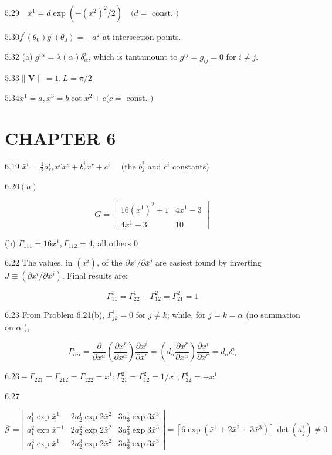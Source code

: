 \documentclass[10pt]{article}
\begin{document}
$5.29 \quad x^{1}=d \exp \left(-\left(x^{2}\right)^{2} / 2\right) \quad(d=$ const. $)$

$5.30 f^{\prime}\left(\theta_{0}\right) g^{\prime}\left(\theta_{0}\right)=-a^{2}$ at intersection points.

5.32 (a) $g^{i \alpha}=\lambda(\alpha) \delta_{\alpha}^{i}$, which is tantamount to $g^{i j}=g_{i j}=0$ for $i \neq j$.

$5.33\|\mathbf{V}\|=1, L=\pi / 2$

$5.34 x^{1}=a, x^{3}=b \cot x^{2}+c(c=$ const. $)$

\section*{CHAPTER 6}
6.19 $\bar{x}^{i}=\frac{1}{2} a_{r s}^{i} x^{r} x^{s}+b_{r}^{i} x^{r}+c^{i} \quad$ (the $b_{j}^{i}$ and $c^{i}$ constants)

$6.20(a)$

$$
G=\left[\begin{array}{cc}
16\left(x^{1}\right)^{2}+1 & 4 x^{1}-3 \\
4 x^{1}-3 & 10
\end{array}\right]
$$

(b) $\Gamma_{111}=16 x^{1}, \Gamma_{112}=4$, all others 0

6.22 The values, in $\left(x^{i}\right)$, of the $\partial x^{i} / \partial \bar{x}^{j}$ are easiest found by inverting $J \equiv\left(\partial \bar{x}^{i} / \partial x^{j}\right)$. Final results are:

$$
\Gamma_{11}^{1}=\Gamma_{22}^{1}-\Gamma_{12}^{2}=\Gamma_{21}^{2}=1
$$

6.23 From Problem 6.21(b), $\Gamma_{j k}^{i}=0$ for $j \neq k$; while, for $j=k=\alpha$ (no summation on $\alpha$ ),

$$
\Gamma_{\alpha \alpha}^{i}=\frac{\partial}{\partial x^{\alpha}}\left(\frac{\partial \bar{x}^{r}}{\partial x^{\alpha}}\right) \frac{\partial x^{i}}{\partial \bar{x}^{r}}=\left(d_{\alpha} \frac{\partial \bar{x}^{r}}{\partial x^{\alpha}}\right) \frac{\partial x^{i}}{\partial \bar{x}^{r}}=d_{\alpha} \delta_{\alpha}^{i}
$$

$6.26-\Gamma_{221}=\Gamma_{212}=\Gamma_{122}=x^{1} ; \Gamma_{21}^{2}=\Gamma_{12}^{2}=1 / x^{1}, \Gamma_{22}^{1}=-x^{1}$

6.27

$$
\overline{\mathscr{J}}=\left|\begin{array}{lll}
a_{1}^{1} \exp \bar{x}^{1} & 2 a_{2}^{1} \exp 2 \bar{x}^{2} & 3 a_{3}^{1} \exp 3 \bar{x}^{3} \\
a_{1}^{2} \exp \bar{x}^{-1} & 2 a_{2}^{2} \exp 2 \bar{x}^{2} & 3 a_{3}^{2} \exp 3 \bar{x}^{3} \\
a_{1}^{3} \exp \bar{x}^{1} & 2 a_{2}^{3} \exp 2 \bar{x}^{2} & 3 a_{3}^{3} \exp 3 \bar{x}^{3}
\end{array}\right|=\left[6 \exp \left(\bar{x}^{1}+2 \bar{x}^{2}+3 \bar{x}^{3}\right)\right] \operatorname{det}\left(a_{j}^{i}\right) \neq 0
$$
\end{document}
